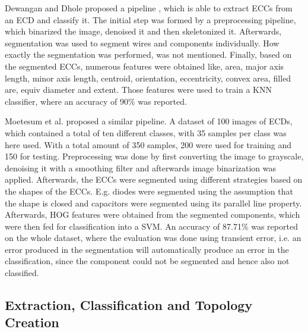 Dewangan and Dhole \cite{ecd_knn_recog} proposed a pipeline , which is able to extract \acp{ECC} from an \ac{ECD} and classify it.
The initial step was formed by a preprocessing pipeline, which binarized the image, denoised it and then skeletonized it.
Afterwards, segmentation was used to segment wires and components individually.
How exactly the segmentation was performed, was not mentioned.
Finally, based on the segmented \acp{ECC}, numerous features were obtained like, area, major axis length, minor axis length, centroid, orientation, eccentricity, convex area, filled are, equiv diameter and extent.
Those features were used to train a \ac{KNN} classifier, where an accuracy of 90\% was reported.

Moetesum et al. \cite{ecd_seghogsvm} proposed a similar pipeline.
A dataset of 100 images of \acp{ECD}, which contained a total of ten different classes, with 35 samples per class was here used.
With a total amount of 350 samples, 200 were used for training and 150 for testing.
Preprocessing was done by first converting the image to grayscale, denoising it with a smoothing filter and afterwards image binarization was applied.
Afterwards, the \acp{ECC} were segmented using different strategies based on the shapes of the \acp{ECC}.
E.g. diodes were segmented using the assumption that the shape is closed and capacitors were segmented using its parallel line property.
Afterwards, \ac{HOG} features were obtained from the segmented components, which were then fed for classification into a \ac{SVM}.
An accuracy of 87.71\% was reported on the whole dataset, where the evaluation was done using transient error, i.e. an error produced in the segmentation will automatically produce an error in the classification, since the component could not be segmented and hence also not classified.

\subsection{Extraction, Classification and Topology Creation}

